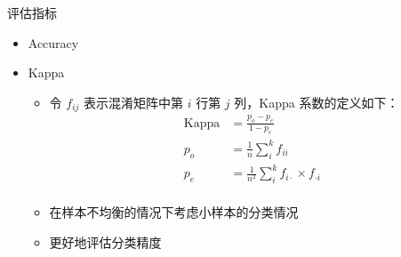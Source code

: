 \documentclass[9pt, aspectratio=1610]{beamer}
\begin{document}
    \begin{frame}{评估指标}
        \begin{itemize}
            \item Accuracy
            \item Kappa\cite{cohen1960}
                \begin{itemize}
                    \item 令 $f_{ij}$ 表示混淆矩阵中第 $i$ 行第 $j$ 列，Kappa 系数的定义如下：
                        $$
                        \begin{aligned}
                        \mathrm{Kappa} &= \frac{p_o-p_e}{1-p_e}\\
                        p_o &= \frac{1}{n}\sum_i^k f_{ii}\\
                        p_e &= \frac{1}{n^2}\sum_i^k f_{i\cdot}\times f_{\cdot i}\\
                        \end{aligned}
                        $$
                    \item 在样本不均衡的情况下考虑小样本的分类情况
                    \item 更好地评估分类精度
                \end{itemize}
        \end{itemize}
    \end{frame}
\end{document}
